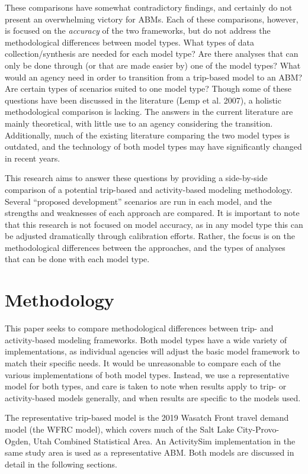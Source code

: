 \documentclass[fancy, twoside, mastersfancy, ms]{byuthesis}
\begin{document}
These comparisons have somewhat contradictory findings, and certainly do
not present an overwhelming victory for ABMs. Each of these comparisons,
however, is focused on the \emph{accuracy} of the two frameworks, but do
not address the methodological differences between model types. What
types of data collection/synthesis are needed for each model type? Are
there analyses that can only be done through (or that are made easier
by) one of the model types? What would an agency need in order to
transition from a trip-based model to an ABM? Are certain types of
scenarios suited to one model type? Though some of these questions have
been discussed in the literature (Lemp et al. 2007), a holistic
methodological comparison is lacking. The answers in the current
literature are mainly theoretical, with little use to an agency
considering the transition. Additionally, much of the existing
literature comparing the two model types is outdated, and the technology
of both model types may have significantly changed in recent years.

This research aims to answer these questions by providing a side-by-side
comparison of a potential trip-based and activity-based modeling
methodology. Several ``proposed development'' scenarios are run in each
model, and the strengths and weaknesses of each approach are compared.
It is important to note that this research is not focused on model
accuracy, as in any model type this can be adjusted dramatically through
calibration efforts. Rather, the focus is on the methodological
differences between the approaches, and the types of analyses that can
be done with each model type.


\chapter{Methodology}\label{sec-methods}

This paper seeks to compare methodological differences between trip- and
activity-based modeling frameworks. Both model types have a wide variety
of implementations, as individual agencies will adjust the basic model
framework to match their specific needs. It would be unreasonable to
compare each of the various implementations of both model types.
Instead, we use a representative model for both types, and care is taken
to note when results apply to trip- or activity-based models generally,
and when results are specific to the models used.

The representative trip-based model is the 2019 Wasatch Front travel
demand model (the WFRC model), which covers much of the Salt Lake
City-Provo-Ogden, Utah Combined Statistical Area. An ActivitySim
implementation in the same study area is used as a representative ABM.
Both models are discussed in detail in the following sections.
\end{document}
